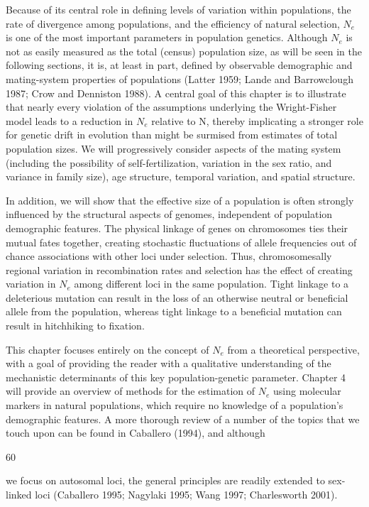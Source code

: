 \documentclass{article}
\begin{document}
Because of its central role in defining levels of variation within populations, the rate of divergence among populations, and the efficiency of natural selection,  $ N_{e} $ is one of the most important parameters in population genetics. Although  $ N_{e} $ is not as easily measured as the total (census) population size, as will be seen in the following sections, it is, at least in part, defined by observable demographic and mating-system properties of populations (Latter 1959; Lande and Barrowclough 1987; Crow and Denniston 1988). A central goal of this chapter is to illustrate that nearly every violation of the assumptions underlying the Wright-Fisher model leads to a reduction in  $ N_{e} $ relative to N, thereby implicating a stronger role for genetic drift in evolution than might be surmised from estimates of total population sizes. We will progressively consider aspects of the mating system (including the possibility of self-fertilization, variation in the sex ratio, and variance in family size), age structure, temporal variation, and spatial structure.

In addition, we will show that the effective size of a population is often strongly influenced by the structural aspects of genomes, independent of population demographic features. The physical linkage of genes on chromosomes ties their mutual fates together, creating stochastic fluctuations of allele frequencies out of chance associations with other loci under selection. Thus, chromosomesally regional variation in recombination rates and selection has the effect of creating variation in  $ N_{e} $ among different loci in the same population. Tight linkage to a deleterious mutation can result in the loss of an otherwise neutral or beneficial allele from the population, whereas tight linkage to a beneficial mutation can result in hitchhiking to fixation.

This chapter focuses entirely on the concept of  $ N_{e} $ from a theoretical perspective, with a goal of providing the reader with a qualitative understanding of the mechanistic determinants of this key population-genetic parameter. Chapter 4 will provide an overview of methods for the estimation of  $ N_{e} $ using molecular markers in natural populations, which require no knowledge of a population's demographic features. A more thorough review of a number of the topics that we touch upon can be found in Caballero (1994), and although

60

we focus on autosomal loci, the general principles are readily extended to sex-linked loci (Caballero 1995; Nagylaki 1995; Wang 1997; Charlesworth 2001).
\end{document}
